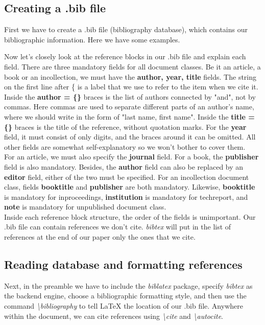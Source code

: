 \documentclass[11pt]{article}  %
\begin{document}
    \subsection{Creating a .bib file}
      First we have to create a .bib file (bibliography database), which contains our bibliographic information. Here we have some examples.

      

      Now let's closely look at the reference blocks in our .bib file and explain each field. There are three mandatory fields for all document classes. Be it an article, a book or an incollection, we must have the \textbf{author, year, title} fields. The string on the first line after \{ is a label that we use to refer to the item when we cite it. Inside the \textbf{author = \{\}} braces is the list of authors connected by "and", not by commas. Here commas are used to separate different parts of an author's name, where we should write in the form of "last name, first name". Inside the \textbf{title = \{\}} braces is the title of the reference, without quotation marks. For the \textbf{year} field, it must consist of only digits, and the braces around it can be omitted. All other fields are somewhat self-explanatory so we won't bother to cover them.\\

      For an article, we must also specify the \textbf{journal} field. For a book, the \textbf{publisher} field is also mandatory. Besides, the \textbf{author} field can also be replaced by an \textbf{editor} field, either of the two must be specified. For an incollection document class, fields \textbf{booktitle} and \textbf{publisher} are both mandatory. Likewise, \textbf{booktitle} is mandatory for inproceedings, \textbf{institution} is mandatory for techreport, and \textbf{note} is mandatory for unpublished document class.\\

      Inside each reference block structure, the order of the fields is unimportant. Our .bib file can contain references we don't cite. \textit{bibtex} will put in the list of references at the end of our paper only the ones that we cite.

    \subsection{Reading database and formatting references}
      Next, in the preamble we have to include the \textit{biblatex} package, specify \textit{bibtex} as the backend engine, choose a bibliographic formatting style, and then use the command \textit{\textbackslash bibliography} to tell LaTeX the location of our .bib file. Anywhere within the document, we can cite references using \textit{\textbackslash cite} and \textit{\textbackslash autocite}.\\
\end{document}
